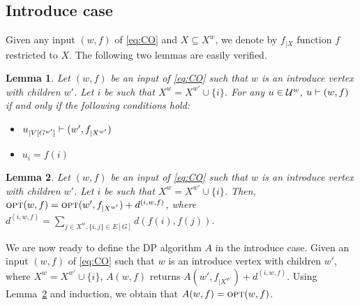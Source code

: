 \documentclass[12pt]{article}
\newtheorem{lemma}{Lemma}
\newcommand{\blue}[1]{{\color{black}#1}}
\begin{document}
\begin{appendix}

\subsection{Introduce case}
Given any input $(w,f)$ of \ref{eq:CO} and $X \subseteq X^w$, we denote by $f_{|X}$ function $f$ restricted to $X$. The following two lemmas are \blue{easily verified}.
\begin{lemma}\label{lemma:intro1}
  Let $(w,f)$ be an input of \ref{eq:CO} such that $w$ is an introduce vertex with children $w'$.
  Let $i$ be such that $X^w = X^{w'} \cup \{i\}$.
  For any $u \in \mathcal{U}^w$, $u \vdash (w,f)$ if and only if the following conditions hold:
  \begin{itemize}
  \item $u_{|V[G^{w'}]} \vdash (w',f_{|X^{w'}})$
  \item $u_i = f(i)$
  \end{itemize}
\end{lemma}

\begin{lemma}\label{lemma:intro2}
  Let $(w,f)$ be an input of \ref{eq:CO} such that $w$ is an introduce vertex with children $w'$.
  Let $i$ be such that $X^w = X^{w'} \cup \{i\}$. Then, 
  $\mbox{\textsc{opt}}(w,f) = \mbox{\textsc{opt}}(w',f_{|X^{w'}})+d^{(i,w,f)}$, where $d^{(i,w,f)} = \sum_{j \in X^w, \{i,j\} \in E[G]} d(f(i),f(j))$.
\end{lemma}

We are now ready to define the DP algorithm $A$ in the introduce case.
Given an input $(w,f)$ of \ref{eq:CO} such that $w$ is an introduce vertex with children $w'$, where $X^w = X^{w'} \cup \{i\}$,
$A(w,f)$ returns $A(w',f_{|X^{w'}})+d^{(i,w,f)}$.
Using Lemma~\ref{lemma:intro2} \blue{and induction, we obtain} that $A(w,f)=\mbox{\textsc{opt}}(w,f)$.



\end{appendix}
\end{document}
